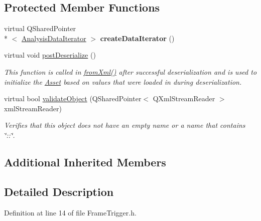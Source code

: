 \subsection*{Protected Member Functions}
\begin{DoxyCompactItemize}
\item 
\hypertarget{class_picto_1_1_frame_trigger_adc16b8d3058a11afba0a9d30227fab78}{virtual Q\-Shared\-Pointer\\*
$<$ \hyperlink{class_picto_1_1_analysis_data_iterator}{Analysis\-Data\-Iterator} $>$ {\bfseries create\-Data\-Iterator} ()}\label{class_picto_1_1_frame_trigger_adc16b8d3058a11afba0a9d30227fab78}

\item 
virtual void \hyperlink{class_picto_1_1_frame_trigger_aa8c2804c29ea2692be117401f9dd97a2}{post\-Deserialize} ()
\begin{DoxyCompactList}\small\item\em This function is called in \hyperlink{class_picto_1_1_asset_a8bed4da09ecb1c07ce0dab313a9aba67}{from\-Xml()} after successful deserialization and is used to initialize the \hyperlink{class_picto_1_1_asset}{Asset} based on values that were loaded in during deserialization. \end{DoxyCompactList}\item 
\hypertarget{class_picto_1_1_frame_trigger_ae8bfb4b9e13de2b68146384c0db79555}{virtual bool \hyperlink{class_picto_1_1_frame_trigger_ae8bfb4b9e13de2b68146384c0db79555}{validate\-Object} (Q\-Shared\-Pointer$<$ Q\-Xml\-Stream\-Reader $>$ xml\-Stream\-Reader)}\label{class_picto_1_1_frame_trigger_ae8bfb4b9e13de2b68146384c0db79555}

\begin{DoxyCompactList}\small\item\em Verifies that this object does not have an empty name or a name that contains \char`\"{}\-::\char`\"{}. \end{DoxyCompactList}\end{DoxyCompactItemize}
\subsection*{Additional Inherited Members}


\subsection{Detailed Description}


Definition at line 14 of file Frame\-Trigger.\-h.



